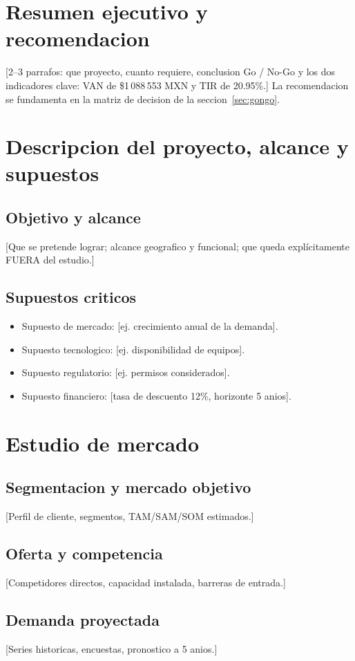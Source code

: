 \documentclass[12pt]{article}
\newcommand{\TasaDescuento}{12}
\newcommand{\VANbase}{1\,088\,553}
\newcommand{\TIRbase}{20.95}
\newcommand{\Moneda}{MXN}
\begin{document}

\tableofcontents
\newpage

\section{Resumen ejecutivo y recomendacion}
[2–3 parrafos: que proyecto, cuanto requiere, conclusion Go / No-Go y los
dos indicadores clave: VAN de \$\VANbase{} \Moneda{} y TIR de \TIRbase{}\%.]
La recomendacion se fundamenta en la matriz de decision de la
seccion~\ref{sec:gongo}.

\section{Descripcion del proyecto, alcance y supuestos}
\subsection{Objetivo y alcance}
[Que se pretende lograr; alcance geografico y funcional; que queda
explícitamente FUERA del estudio.]
\subsection{Supuestos criticos}
\begin{itemize}
  \item Supuesto de mercado: [ej. crecimiento anual de la demanda].
  \item Supuesto tecnologico: [ej. disponibilidad de equipos].
  \item Supuesto regulatorio: [ej. permisos considerados].
  \item Supuesto financiero: [tasa de descuento \TasaDescuento{}\%, horizonte 5 anios].
\end{itemize}

\section{Estudio de mercado}
\subsection{Segmentacion y mercado objetivo}
[Perfil de cliente, segmentos, TAM/SAM/SOM estimados.]
\subsection{Oferta y competencia}
[Competidores directos, capacidad instalada, barreras de entrada.]
\subsection{Demanda proyectada}
[Series historicas, encuestas, pronostico a 5 anios.]
\end{document}
